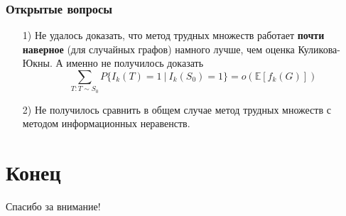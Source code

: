 \documentclass[utf8]{beamer}
\begin{document}
	\begin{frame}
		\frametitle{Открытые вопросы}
		\begin{itemize}
		    \item[1)] Не удалось доказать, что метод трудных множеств работает \textbf{почти наверное} 
		    (для случайных графов) намного лучше, чем оценка Куликова-Юкны. А именно не получилось доказать
		    $$\sum\limits_{T:T\sim S_0}P\{I_k(T) = 1\ |\ I_k(S_0) = 1\} = o(\mathbb{E}[f_k(G)])$$
		    
		    \item[2)] Не получилось сравнить в общем случае метод трудных множеств с методом информационных неравенств.
		\end{itemize}
	\end{frame}
	
	\section{Конец}
	\begin{frame}
	    \centering \Large{Спасибо за внимание!}
	\end{frame}
	
\end{document}
